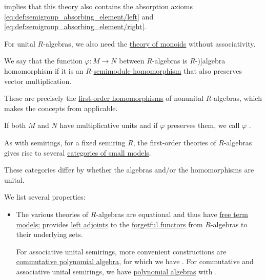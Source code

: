 \begin{definition}
\begin{thmenum}
     implies that this theory also contains the absorption axioms \eqref{eq:def:semigroup_absorbing_element/left} and \eqref{eq:def:semigroup_absorbing_element/right}.

    For unital \( R \)-algebras, we also need the \hyperref[def:monoid/theory]{theory of monoids} without associativity.

     We say that the function \( \varphi: M \to N \) between \( R \)-algebras is \( R \)-\term[en=homomorphism (\cite[def. 3.1.2]{Bourbaki1998Algebra1to3})]{algebra homomorphism} if it is an \( R \)-\hyperref[def:semimodule/morphism]{semimodule homomorphism} that also preserves vector multiplication.

    These are precisely the \hyperref[def:fol_homomorphism]{first-order homomorphisms} of nonunital \( R \)-algebras, which makes the concepts from  applicable.

    If both \( M \) and \( N \) have multiplicative units and if \( \varphi \) preserves them, we call \( \varphi \) .

     As with semirings, for a fixed semiring \( R \), the first-order theories of \( R \)-algebras gives rise to several \hyperref[def:fol_theory_model_functor/obj]{categories of small models}.

    These categories differ by whether the algebras and/or the homomorphisms are unital.

    We list several properties:
    \begin{itemize}
      \item The various theories of \( R \)-algebras are equational and thus have \hyperref[def:fol_free_term_model]{free term models};  provides \hyperref[def:adjoint_functor]{left adjoints} to the \hyperref[def:fol_theory_forgetful_functor/set]{forgetful functors} from \( R \)-algebras to their underlying sets.

      For associative unital semirings, more convenient constructions are \hyperref[def:noncommutative_polynomial_algebra]{commutative polynomial algebra}, for which we have . For commutative and associative unital semirings, we have \hyperref[def:polynomial_algebra]{polynomial algebras} with .
    \end{itemize}


\end{thmenum}
\end{definition}
